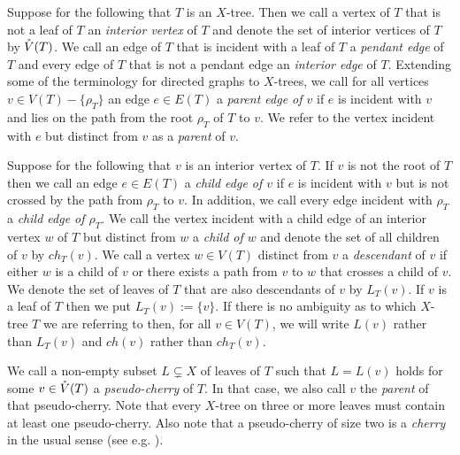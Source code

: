 Suppose for the following  that
$T$ is an $X$-tree. Then we call a vertex of $T$ that is not
 a leaf of $T$ an {\em interior vertex}
of $T$ and denote the set of interior vertices of $T$ by $\mathring{V}(T)$.
We call an edge of $T$  that is incident with a leaf of $T$ a {\em pendant
edge} of $T$ and every edge of $T$ that is not a pendant edge
an {\em interior edge} of $T$.
Extending some of the terminology for directed graphs
to $X$-trees, we call for all vertices $v\in V(T)-\{\rho_T\}$
 an edge $e\in E(T)$
a  {\em parent edge of $v$} if $e$ is incident with $v$ and 
lies on the path from 
the root $\rho_T$ of $T$ to $v$. We refer to the vertex incident with $e$ 
 but distinct from $v$ as a {\em parent} of $v$.
 
Suppose for the following
that $v$ is an interior vertex of $T$. If $v$ is not the root of $T$
then we call an edge $e\in E(T)$ a {\em child edge of $v$} if $e$ is
incident with $v$ but is not crossed by the path from $\rho_T$ to $v$.  
In addition, we
call every edge incident with $\rho_T$ a {\em child edge of $\rho_T$}.
We call the vertex incident with a child edge of an
 interior vertex $w$ of $T$
 but distinct from $w$ a {\em child of $w$} and denote
 the set of all children of $v$ by $ch_T(v)$.
We call a vertex $w\in V(T)$ distinct from $v$
a {\em descendant} of $v$ if either $w$ is a child of $v$ or
there exists a path from $v$ to $w$ that crosses a child of $v$.
We denote the set of leaves 
of $T$ that are also descendants of $v$ by $L_T(v)$. If $v$ is a leaf
of $T$ then we put $L_T(v):=\{v\}$. If there
is no ambiguity as to which $X$-tree $T$ we are referring to then,
for all $v\in V(T)$,  we will write $L(v)$ rather than $L_T(v)$
and $ch(v)$ rather than $ch_T(v)$.  

We call a non-empty subset $L\subsetneq X$ of 
leaves of $T$ such that $L=L(v)$ holds for some
$v\in \mathring{V}(T)$ a {\em pseudo-cherry} of $T$. In that case,
we also call $v$ the {\em parent} of that pseudo-cherry. 
Note that every 
$X$-tree on three or more leaves must
contain at least one pseudo-cherry. Also note
that a pseudo-cherry of size two is 
a {\em cherry} in the usual sense (see e.g. \cite{semple2003phylogenetics}).

